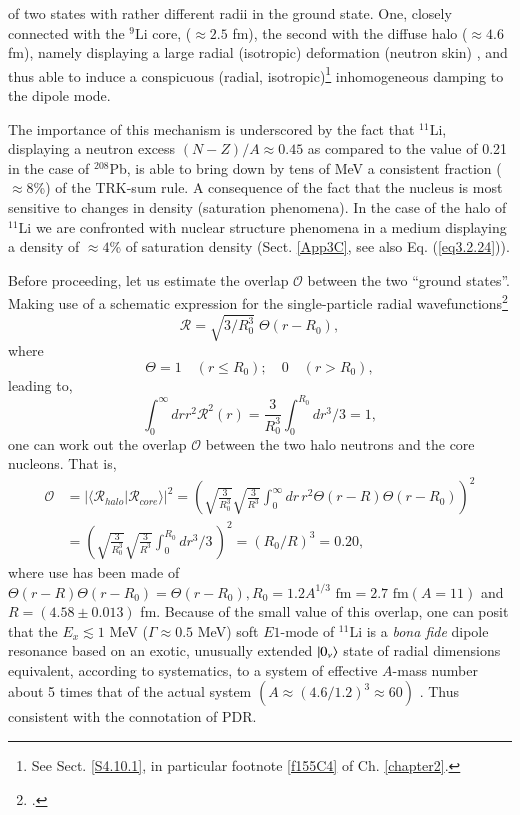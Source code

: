 of two states with rather different radii in the ground state. One, closely connected with the $^{9}$Li core, ($\approx 2.5$ fm), the second with the diffuse halo ($\approx 4.6$ fm), namely displaying a large radial (isotropic) deformation (neutron skin) 
, and thus able to induce a conspicuous (radial, isotropic)\footnote{See Sect. \ref{S4.10.1}, in particular footnote \ref{f155C4} of Ch. \ref{chapter2}.} inhomogeneous damping to the dipole mode. 


The importance of this mechanism is underscored by the fact that  $^{11}$Li, displaying a neutron excess $(N-Z)/A\approx0.45$ as compared to the value of 0.21 in the case of $^{208}$Pb, is able to bring down by tens of MeV a consistent fraction ($\approx 8$\%) of the TRK-sum rule. A consequence of the fact that the nucleus is most sensitive to changes in density (saturation phenomena). In the case of the halo of $^{11}$Li we are confronted with nuclear structure phenomena in a medium displaying a density of $\approx 4$\% of saturation density (Sect. \ref{App3C}, see also Eq. (\ref{eq3.2.24})). 

Before proceeding, let us estimate the overlap $\mathcal{O}$ between the two ``ground states''. Making use of a schematic expression for the single-particle radial wavefunctions\footnote{\cite{Bohr:69}.}
\begin{equation}
\mathcal{R}=\sqrt{3/R_0^3}\;\Theta(r-R_0),
\end{equation}
where 
\begin{equation*}
\Theta=1 \quad (r\leq R_0);\quad 0 \quad (r>R_0),
\end{equation*}
leading to,
\begin{equation}
\int_0^{\infty}dr r^2 \mathcal{R}^2(r)=\frac{3}{R_0^3}\int_0^{R_0}dr^3/3=1,
\end{equation}
one can work out the overlap $\mathcal{O}$ between the two halo neutrons and the core nucleons. That is, 
\begin{equation}\label{eq2.6.4}
\begin{split}
\mathcal{O}&=|\langle\mathcal{R}_{halo}|\mathcal{R}_{core}\rangle|^2=\left(\sqrt{\frac{3}{R_0^3}}\sqrt{\frac{3}{R^3}}\int_0^{\infty}dr\,r^2\Theta(r-R)\Theta(r-R_0)\right)^2\\
&=\left(\sqrt{\frac{3}{R_0^3}}\sqrt{\frac{3}{R^3}}\int_0^{R_0}dr^3/3\,\right)^2=(R_0/R)^3=0.20,
\end{split}
\end{equation}
where use has been made of $\Theta(r-R)\Theta(r-R_0)=\Theta(r-R_0), R_0=1.2A^{1/3} \text{ fm}=2.7 \text{ fm} (A=11)$ and $R=(4.58\pm 0.013)$ fm.
Because of the small value of this overlap, one can posit that the $E_x\lesssim1$ MeV ($\Gamma \approx 0.5$ MeV) soft $E1$-mode of $^{11}$Li is a \textit{bona fide} dipole  resonance based on an exotic, unusually extended $|{0_\nu} \rangle$ state of radial dimensions equivalent, according to systematics, to  a system of effective $A$-mass number about 5 times that of the actual system $(A\approx (4.6/1.2)^3\approx 60)$ .
 Thus consistent with the connotation of PDR.

